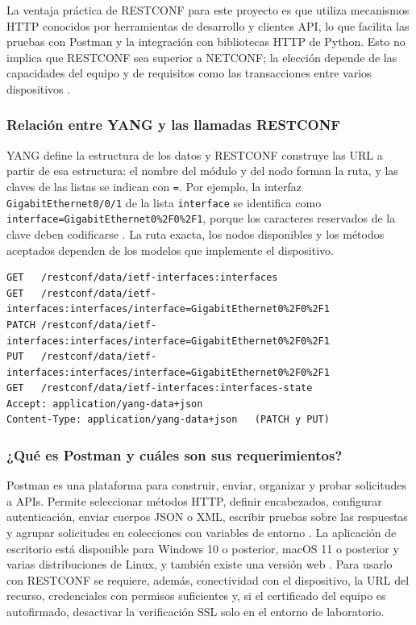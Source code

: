 La ventaja práctica de RESTCONF para este proyecto es que utiliza mecanismos HTTP conocidos por herramientas de desarrollo y clientes API, lo que facilita las pruebas con Postman y la integración con bibliotecas HTTP de Python. Esto no implica que RESTCONF sea superior a NETCONF; la elección depende de las capacidades del equipo y de requisitos como las transacciones entre varios dispositivos \parencite{rfc6241,rfc8040}.

\subsubsection{Relación entre YANG y las llamadas RESTCONF}
YANG define la estructura de los datos y RESTCONF construye las URL a partir de esa estructura: el nombre del módulo y del nodo forman la ruta, y las claves de las listas se indican con \texttt{=}. Por ejemplo, la interfaz \texttt{GigabitEthernet0/0/1} de la lista \texttt{interface} se identifica como \texttt{interface=GigabitEthernet0\%2F0\%2F1}, porque los caracteres reservados de la clave deben codificarse \parencite{rfc8040}. La ruta exacta, los nodos disponibles y los métodos aceptados dependen de los modelos que implemente el dispositivo.

\begin{lstlisting}[language={},caption={Endpoints RESTCONF utilizados en el proyecto}]
GET   /restconf/data/ietf-interfaces:interfaces
GET   /restconf/data/ietf-interfaces:interfaces/interface=GigabitEthernet0%2F0%2F1
PATCH /restconf/data/ietf-interfaces:interfaces/interface=GigabitEthernet0%2F0%2F1
PUT   /restconf/data/ietf-interfaces:interfaces/interface=GigabitEthernet0%2F0%2F1
GET   /restconf/data/ietf-interfaces:interfaces-state
Accept: application/yang-data+json
Content-Type: application/yang-data+json   (PATCH y PUT)
\end{lstlisting}

\subsubsection{¿Qué es Postman y cuáles son sus requerimientos?}
Postman es una plataforma para construir, enviar, organizar y probar solicitudes a APIs. Permite seleccionar métodos HTTP, definir encabezados, configurar autenticación, enviar cuerpos JSON o XML, escribir pruebas sobre las respuestas y agrupar solicitudes en colecciones con variables de entorno \parencite{postman}. La aplicación de escritorio está disponible para Windows 10 o posterior, macOS 11 o posterior y varias distribuciones de Linux, y también existe una versión web \parencite{postman_req}. Para usarlo con RESTCONF se requiere, además, conectividad con el dispositivo, la URL del recurso, credenciales con permisos suficientes y, si el certificado del equipo es autofirmado, desactivar la verificación SSL solo en el entorno de laboratorio.

